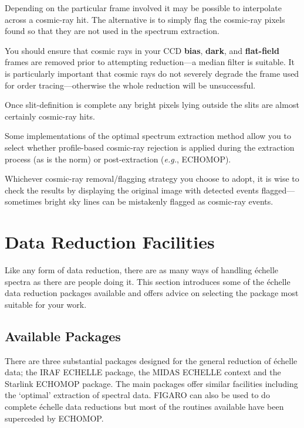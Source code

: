\documentclass[twoside,11pt]{article}
\newcommand{\stardocinitials}  {SG}
\newcommand{\stardocnumber}    {9.2}
\newcommand{\stardocname}{\stardocinitials /\stardocnumber}
\newcommand{\htmlref}[2]{#1}
\newcommand{\xref}[3]{#1}
\newcommand{\xlabel}[1]{}
\newcommand{\sgspec}[2]{#1}
\newcommand{\sgspec}[2]{#2}
\begin{document}
Depending on the particular frame involved it may be possible to
interpolate across a cosmic-ray hit.  The alternative is to simply flag
the cosmic-ray pixels found so that they are not used in the spectrum
extraction.

You should ensure that cosmic rays in your CCD \htmlref{{\bf bias}}
{gl_bias_frame}, \htmlref{{\bf dark}}{gl_dark_frame}, and
\htmlref{{\bf flat-field}}{gl_flat_field} frames are removed prior to
attempting reduction\sgspec{---}{ - }a median filter is suitable.  It is
particularly important that cosmic rays do not severely degrade the
frame used for order tracing\sgspec{---}{ - }otherwise the whole
reduction will be unsuccessful.

Once slit-definition is complete any bright pixels lying outside the
slits are almost certainly cosmic-ray hits.

Some implementations of the optimal spectrum extraction method allow you
to select whether profile-based cosmic-ray rejection is applied
during the extraction process (as is the norm) or post-extraction
({\em{e.g.}}, \xref{ECHOMOP}{sun152}{})\@.

Whichever cosmic-ray removal/flagging strategy you choose to adopt, it
is wise to check the results by displaying the original image with
detected events flagged\sgspec{---}{ - }sometimes bright sky lines can be
mistakenly flagged as cosmic-ray events.


\section{\label{se_facilities}\xlabel{selecting_a_package}Data
         Reduction Facilities }
\markboth{Data Reduction Facilities}{\stardocname}

Like any form of data reduction, there are as many ways of handling
\'{e}chelle spectra as there are people doing it.
This section introduces some of the \'{e}chelle data reduction packages
available and offers advice on selecting the package most suitable for
your work.


\subsection{\label{se_packages}\xlabel{packages}Available Packages}

There are three substantial packages designed for the general
reduction of \'{e}chelle data; the IRAF ECHELLE package, the MIDAS
ECHELLE context and the Starlink \xref{ECHOMOP}{sun152}{} package.
The main packages offer similar facilities including the `optimal'
extraction of spectral data.
\xref{FIGARO}{sun86}{} can also be used to do complete \'{e}chelle
data reductions but most of the routines available have been superceded
by ECHOMOP.
\end{document}
